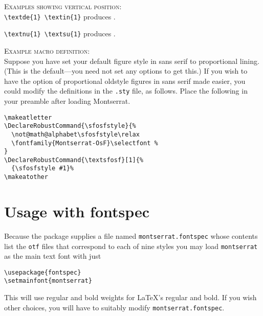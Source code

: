 \documentclass[11pt]{article}
\begin{document}
\textsc{Examples showing vertical position:}\\
\verb|\textde{1} \textin{1}|  produces   .
 
\verb|\textnu{1} \textsu{1}|  produces   . 



\textsc{Example macro definition:}\\
Suppose you have set your default figure style in sans serif to proportional lining. (This is the default---you need not set any options to get this.) If you wish to have the option of proportional oldstyle figures in sans serif made easier, you could modify the definitions in the {\tt.sty} file, as follows. Place the following in your preamble after loading Montserrat.
\begin{verbatim}
\makeatletter
\DeclareRobustCommand{\sfosfstyle}{%
  \not@math@alphabet\sfosfstyle\relax
  \fontfamily{Montserrat-OsF}\selectfont %
}
\DeclareRobustCommand{\textsfosf}[1]{%
  {\sfosfstyle #1}%
\makeatother
\end{verbatim}

\section*{Usage with fontspec}
Because the package supplies a file named {\tt montserrat.fontspec} whose contents list the {\tt otf} files that correspond to each of nine styles you may load {\tt montserrat} as the main text font with just
\begin{verbatim}
\usepackage{fontspec}
\setmainfont{montserrat}
\end{verbatim}
This will use regular and bold weights for \LaTeX's regular and bold. If you wish other choices, you will have to suitably modify {\tt montserrat.fontspec}.
\end{document}
